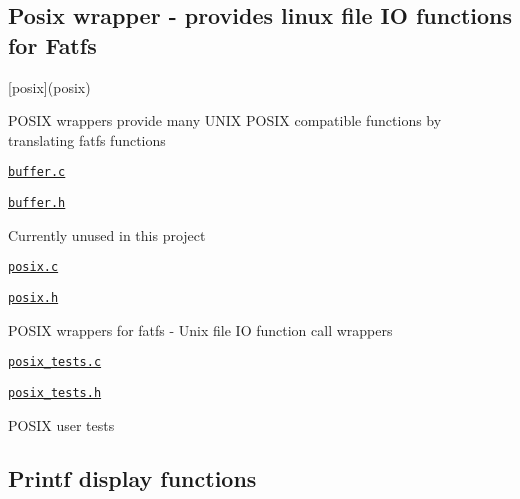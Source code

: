 \subsection*{Posix wrapper -\/ provides linux file IO functions for Fatfs}


\begin{DoxyItemize}
\item \mbox{[}posix\mbox{]}(posix)
\begin{DoxyItemize}
\item P\+O\+S\+IX wrappers provide many U\+N\+IX P\+O\+S\+IX compatible functions by translating fatfs functions
\item \href{buffer.c}{\tt buffer.\+c}
\item \href{buffer.h}{\tt buffer.\+h}
\begin{DoxyItemize}
\item Currently unused in this project
\end{DoxyItemize}
\item \href{posix/posix.c}{\tt posix.\+c}
\item \href{posix/posix.h}{\tt posix.\+h}
\begin{DoxyItemize}
\item P\+O\+S\+IX wrappers for fatfs -\/ Unix file IO function call wrappers
\end{DoxyItemize}
\item \href{posix/posix_tests.c}{\tt posix\+\_\+tests.\+c}
\item \href{posix/posix_tests.h}{\tt posix\+\_\+tests.\+h}
\begin{DoxyItemize}
\item P\+O\+S\+IX user tests
\end{DoxyItemize}
\end{DoxyItemize}
\end{DoxyItemize}

\subsection*{Printf display functions}


